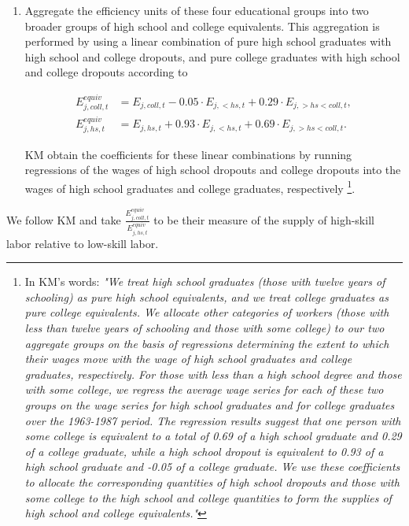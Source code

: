 \documentclass[10pt]{article}
\begin{document}
\begin{enumerate}
\item Aggregate the efficiency units of these four educational groups into two broader groups of high school and college equivalents. This aggregation is performed by using a linear combination of pure high school graduates with high school and college dropouts, and pure college graduates with high school and college dropouts according to 

\begin{align*}
E^{equiv}_{j,coll,t}    & = E_{j,coll,t}    - 0.05 \cdot  E_{j,<hs,t} + 0.29 \cdot E_{j,>hs<coll,t}, \\
E^{equiv}_{j,hs,t}      & = E_{j,hs,t}      + 0.93 \cdot  E_{j,<hs,t} + 0.69 \cdot E_{j,>hs<coll,t}.
\end{align*}

KM obtain the coefficients for these linear combinations by running regressions of the wages of high school dropouts and college dropouts into the wages of high school graduates and college graduates, respectively \footnote{In KM's words: \textit{"We treat high school graduates (those with twelve years of schooling) as pure high school equivalents, and we treat college graduates as pure college equivalents. We allocate other categories of workers (those with less than twelve years of schooling and those with some college) to our two aggregate groups on the basis of regressions determining the extent to which their wages move with the wage of high school graduates and college graduates, respectively. For those with less than a high school degree and those with some college, we regress the average wage series for each of these two groups on the wage series for high school graduates and for college graduates over the 1963-1987 period. The regression results suggest that one person with  some college is equivalent to a total of 0.69 of a high school graduate and 0.29 of a college graduate, while a high school dropout is equivalent to 0.93 of a high school graduate and -0.05 of a college graduate. We use these coefficients to allocate the corresponding quantities of high school dropouts and those with some college to the high school and college quantities to form the supplies of high school and college equivalents."}}.\\
\end{enumerate}
We follow KM and take $\frac{E^{equiv}_{j,coll,t}}{E^{equiv}_{j,hs,t} }$ to be their measure of the supply of high-skill labor relative to low-skill labor.\\
\end{document}
